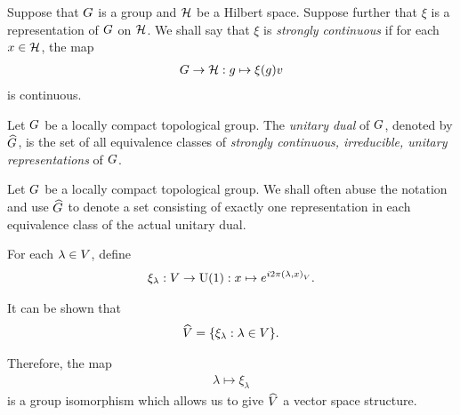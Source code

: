 \begin{definition}
\label{definition:strongly_continuous_representation}
    Suppose that $G$ is a group and $\mathcal{H}$ be a Hilbert space.
    Suppose further that $\xi$ is a representation of $G$ on $\mathcal{H}$.
    We shall say that $\xi$ is \emph{strongly continuous}
    if for each $x \in \mathcal{H}$,
    the map
    \begin{align*}
        G \to \mathcal{H} : g \mapsto \xi(g) v
    \end{align*}
    is continuous.
\end{definition}

\begin{definition}
\label{definition:unitary_dual}
    Let $G$ be a locally compact topological group.
    The \emph{unitary dual} of $G$, denoted by ${\widehat{G}}$,
    is the set of all equivalence classes of
    \emph{strongly continuous, irreducible, unitary representations} of $G$.
\end{definition}

\begin{remark}
    Let $G$ be a locally compact topological group.
    We shall often abuse the notation and use ${\widehat{G}}$ to denote a set consisting of
    exactly one representation in each equivalence class of the actual unitary dual.
\end{remark}

\begin{example}[$\dualGroup\VectorSpace$]
    For each $\lambda \in V$,
    define
    \begin{align}
        \xi_\lambda : V \to {\mathrm{U} (1)} : x \mapsto e^{i 2 \pi {\left(\lambda, x\right)_{V}}}.
        \label{eq:elements_of_dual_of_vector_space}
    \end{align}

    It can be shown that
    \begin{align*}
        {\widehat{V}} = \{ \xi_\lambda : \lambda \in V \}.
    \end{align*}

    Therefore, the map
    \begin{align}
        \lambda \mapsto \xi_\lambda
        \label{eq:isomorphism_between_vector_space_and_its_dual_group}
    \end{align}
    is a group isomorphism which allows us to give $\dualGroup\VectorSpace$ a vector space structure.
\end{example}

